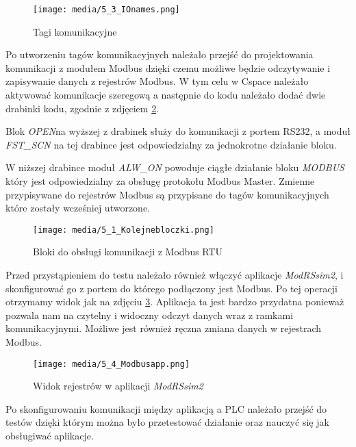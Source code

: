 \documentclass{article}
\begin{document}
\begin{figure}[H]
    \centering
    \texttt{[image: media/5\_3\_IOnames.png]}
    \caption{Tagi komunikacyjne}
    \label{fig:zdj9}
\end{figure}


Po utworzeniu tagów komunikacyjnych należało przejść do projektowania komunikacji z modułem Modbus dzięki czemu możliwe będzie odczytywanie i zapisywanie danych z rejestrów Modbus. W tym celu w Cspace należało aktywować komunikacje szeregową a następnie do  kodu należało dodać dwie drabinki kodu, zgodnie z zdjęciem \ref{fig:zdj7}.

Blok \textit{OPEN}na wyższej z drabinek służy do komunikacji z portem RS232, a moduł \textit{FST\_SCN} na tej drabince jest odpowiedzialny za jednokrotne działanie bloku. 

W niższej drabince moduł \textit{ALW\_ON} powoduje ciągłe działanie bloku \textit{MODBUS} który jest odpowiedzialny za obsługę protokołu Modbus Master. Zmienne przypisywane  do rejestrów Modbus są przypisane do tagów komunikacyjnych które zostały wcześniej utworzone.

\begin{figure}[H]
    \centering
    \texttt{[image: media/5\_1\_Kolejnebloczki.png]}
    \caption{Bloki do obsługi komunikacji z Modbus RTU}
    \label{fig:zdj7}
\end{figure}


Przed przystąpieniem do testu należało również włączyć aplikacje \textit{ModRSsim2},
i skonfigurować go z portem do którego podłączony jest Modbus. Po tej operacji otrzymamy widok jak na zdjęciu \ref{fig:zdj10}. Aplikacja ta jest bardzo przydatna ponieważ pozwala nam na czytelny i widoczny odczyt danych wraz z ramkami komunikacyjnymi. Możliwe jest również ręczna zmiana danych w rejestrach Modbus.

\begin{figure}[H]
    \centering
    \texttt{[image: media/5\_4\_Modbusapp.png]}
    \caption{Widok rejestrów w aplikacji \textit{ModRSsim2}}
    \label{fig:zdj10}
\end{figure}

Po skonfigurowaniu komunikacji między aplikacją a PLC należało przejść do testów dzięki którym można było przetestować działanie oraz nauczyć się jak obsługiwać aplikacje.
\newpage
\end{document}
